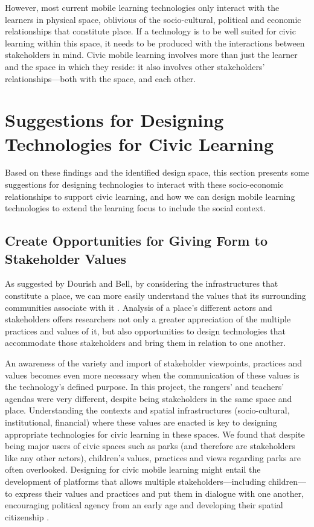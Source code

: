 However, most current mobile learning technologies only interact with the learners in physical space, oblivious of the socio-cultural, political and economic relationships that constitute place. If a technology is to be well suited for civic learning within this space, it needs to be produced with the interactions between stakeholders in mind. Civic mobile learning involves more than just the learner and the space in which they reside: it also involves other stakeholders' relationships---both with the space, and each other.

\section{Suggestions for Designing Technologies for Civic Learning}
\label{sec:SuggestionsCivicLearning}

Based on these findings and the identified design space, this section presents some suggestions for designing technologies to interact with these socio-economic relationships to support civic learning, and how we can design mobile learning technologies to extend the learning focus to include the social context.

\subsection{Create Opportunities for Giving Form to Stakeholder Values}

As suggested by Dourish and Bell, by considering the infrastructures that constitute a place, we can more easily understand the values that its surrounding communities associate with it \citep{Dourish2007}. Analysis of a place's different actors and stakeholders offers researchers not only a greater appreciation of the multiple practices and values of it, but also opportunities to design technologies that accommodate those stakeholders and bring them in relation to one another.

An awareness of the variety and import of stakeholder viewpoints, practices and values becomes even more necessary when the communication of these values is the technology’s defined purpose. In this project, the rangers' and teachers' agendas were very different, despite being stakeholders in the same space and place. Understanding the contexts and spatial infrastructures (socio-cultural, institutional, financial) where these values are enacted is key to designing appropriate technologies for civic learning in these spaces. We found that despite being major users of civic spaces such as parks (and therefore are stakeholders like any other actors), children’s values, practices and views regarding parks are often overlooked. Designing for civic mobile learning might entail the development of platforms that allows multiple stakeholders---including children---to express their values and practices and put them in dialogue with one another, encouraging political agency from an early age and developing their spatial citizenship \citep{Gryl2012}.

